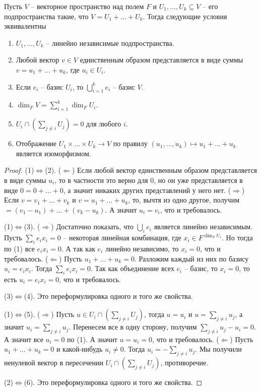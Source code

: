 \begin{claim}\label{claim::DirectSum}
Пусть $V$ -- векторное пространство над полем $F$ и $U_1,\ldots,U_k \subseteq V$ -- его подпространства такие, что $V = U_1+\ldots + U_k$. Тогда следующие условия эквивалентны
\begin{enumerate}
\item $U_1,\ldots,U_k$ -- линейно независимые подпространства.

\item Любой вектор $v\in V$ единственным образом представляется в виде суммы $v = u_1 + \ldots + u_k$, где $u_i \in U_i$.

\item Если $e_i$ -- базис $U_i$, то $\bigcup_{i=1}^k e_i$ -- базис $V$.

\item $\dim_F V = \sum_{i=1}^k \dim_F U_i$.

\item $U_i \cap (\sum_{j\neq i}U_j) = 0$ для любого $i$.

\item Отображение $U_1\times \ldots \times U_k\to V$ по правилу $(u_1,\ldots,u_k)\mapsto u_1 + \ldots + u_k$ является изоморфизмом.

\end{enumerate}
\end{claim}
\begin{proof}
(1)$\Leftrightarrow$(2). ($\Leftarrow$) Если любой вектор единственным образом представляется в виде суммы $u_i$, то в частности это верно для $0$, но он уже представляется в виде $0 = 0 + \ldots + 0$, а значит никаких других представлений у него нет. ($\Rightarrow$) Если $v = v_1 + \ldots + v_k$ и $v = u_1 + \ldots + u_k$, то, вычтя из одно другое, получим $ = (v_1 - u_1) + \ldots + (v_k - u_k)$. А значит $u_i = v_i$, что и требовалось.

(1)$\Leftrightarrow$(3). ($\Rightarrow$) Достаточно показать, что $\bigcup_i e_i$ является линейно независимым. Пусть $\sum_i e_i x_i = 0$ -- некоторая линейная комбинация, где $x_i\in F^{\dim_F U_i}$. Но тогда по (1) все $e_i x_i = 0$. А так как $e_i$ линейно независимо, то $x_i = 0$, что и требовалось. ($\Leftarrow$) Пусть $u_1 + \ldots + u_k = 0$. Разложим каждый из них по базису $u_i = e_i x_i$. Тогда $\sum_i e_i x_i = 0$. Так как объединение всех $e_i$ -- базис, то $x_i = 0$, то есть $u_i = e_i x_i = 0$, что и требовалось.

(3)$\Leftrightarrow$(4). Это переформулировка одного и того же свойства.

(1)$\Leftrightarrow$(5). ($\Rightarrow$) Пусть $u\in U_i\cap (\sum_{j\neq i} U_j)$, тогда $u = u_i$ и $u = \sum_{j\neq i} u_j$, а значит $u_i = \sum_{j\neq i} u _j$. Перенесем все в одну сторону, получим $\sum_{j\neq i} u _j - u_i = 0$. А значит все $u_i = 0$ по (1). А значит $u = u_i = 0$, что и требовалось. ($\Leftarrow$) Пусть $u_1 + \ldots + u_k = 0$ и какой-нибудь $u_i\neq 0$. Тогда $u_i = - \sum_{j\neq i}u_j$. Мы получили ненулевой вектор в пересечении $U_i \cap (\sum_{j\neq i}U_j)$, противоречие.

(2)$\Leftrightarrow$(6). Это переформулировка одного и того же свойства.

\end{proof}

